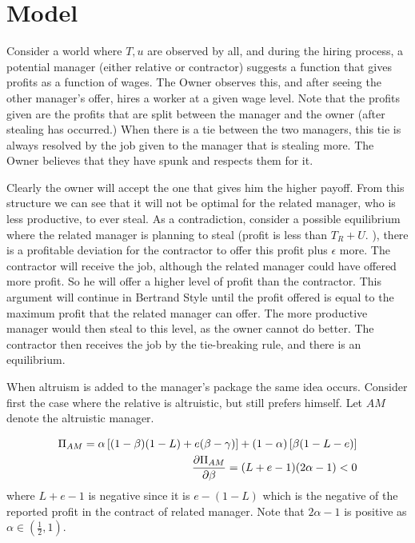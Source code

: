 \documentclass[12pt]{paper}
\begin{document}
\section{Model}

Consider a world where $T,u$ are observed by all, and during the
hiring process, a potential manager (either relative or contractor)
suggests a function that gives profits as a function of wages. The
Owner observes this, and after seeing the other manager's offer, hires
a worker at a given wage level. Note that the profits given are the
profits that are split between the manager and the owner (after
stealing has occurred.) When there is a tie between the two managers,
this tie is always resolved by the job given to the manager that is
stealing more. The Owner believes that they have spunk and respects
them for it. 

Clearly the owner will accept the one that gives him the higher
payoff.  From this structure we can see that it will not be optimal
for the related manager, who is less productive, to ever steal. As a
contradiction, consider a possible equilibrium where the related
manager is planning to steal (profit is less than $T_R + U$. ), there
is a profitable deviation for the contractor to offer this profit plus
$\epsilon$ more. The contractor will receive the job, although the related
manager could have offered more profit. So he will offer a higher
level of profit than the contractor. This argument will continue in
Bertrand Style until the profit offered is equal to the maximum profit
that the related manager can offer. The more productive manager would
then steal to this level, as the owner cannot do better. The
contractor then receives the job by the tie-breaking rule, and there
is an equilibrium.

When altruism is added to the manager's package the same idea
occurs. Consider first the case where the relative is altruistic, but
still prefers himself. Let $AM$ denote the altruistic manager.

\begin{align*}
  \Pi_{AM} = \alpha \left[ (1-\beta)(1-L) + e(\beta-\gamma) \right] + (1-\alpha)\left[ \beta(1-L-e)
  \right]\\
  \frac{ \partial \Pi_{AM}}{ \partial \beta} = (L+e-1)(2\alpha-1) < 0
\end{align*}
where $L+e-1$ is negative since it is $e - (1-L)$ which is the
negative of the reported profit in the contract of related
manager. Note that $2\alpha-1$ is positive as $\alpha \in (\frac{1}{2},1)$.
\end{document}
